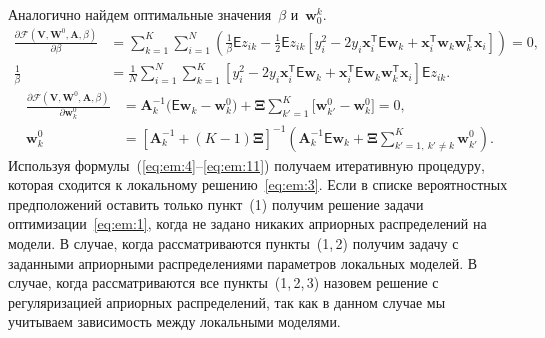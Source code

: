 \documentclass[12pt, twoside]{article}
\numberwithin{equation}{section}
\begin{document}
Аналогично найдем оптимальные значения~$\beta$ и~$\textbf{w}_0^{k}$.
\begin{equation}
\label{eq:em:10}
\begin{aligned}
\frac{\partial \mathcal{F}\left(\textbf{V}, \textbf{W}^{0}, \textbf{A}, \beta\right)}{\partial \beta} &= \sum_{k=1}^{K}\sum_{i=1}^{N}\left(\frac{1}{\beta}\mathsf{E}z_{ik}-\frac{1}{2}\mathsf{E}z_{ik}\left[y_{i}^{2}-2y_{i}\textbf{x}_{i}^{\mathsf{T}}\mathsf{E}\textbf{w}_{k}+\textbf{x}_{i}^{\mathsf{T}}\textbf{w}_{k}\textbf{w}_{k}^{\mathsf{T}}\textbf{x}_{i}\right]\right) = 0,\\
\frac{1}{\beta}&=\frac{1}{N}\sum_{i=1}^{N}\sum_{k=1}^{K}\left[y_{i}^{2}-2y_{i}\textbf{x}_{i}^{\mathsf{T}}\mathsf{E}\textbf{w}_{k} + \textbf{x}_{i}^{\mathsf{T}}\mathsf{E}\textbf{w}_{k}\textbf{w}_{k}^{\mathsf{T}}\textbf{x}_{i}\right]\mathsf{E}z_{ik}.
\end{aligned}
\end{equation}
\begin{equation}
\label{eq:em:11}
\begin{aligned}
\frac{\partial \mathcal{F}\left(\textbf{V}, \textbf{W}^{0}, \textbf{A}, \beta\right)}{\partial \mathbf{w}_k^0} &= \mathbf{A}_k^{-1}\bigr(\mathsf{E}\mathbf{w}_k - \mathbf{w}_{k}^{0}\bigr) + \bm{\Xi}\sum_{k'=1}^{K}\bigr[\mathbf{w}_{k'}^{0} -\mathbf{w}_{k}^{0}\bigr] = 0,\\
\textbf{w}_{k}^{0} &=\left[\textbf{A}_{k}^{-1}+\left(K-1\right)\bm{\Xi}\right]^{-1}\left(\textbf{A}^{-1}_{k}\mathsf{E}\textbf{w}_{k}+\bm{\Xi}\sum_{k'=1,~k'\not=k}^{K}\textbf{w}_{k'}^{0}\right).
\end{aligned}
\end{equation}
Используя формулы~(\ref{eq:em:4}--\ref{eq:em:11}) получаем итеративную процедуру, которая сходится к локальному решению~\eqref{eq:em:3}.
Если в списке вероятностных предположений оставить только пункт~(1) получим решение задачи оптимизации~\eqref{eq:em:1}, когда не задано никаких априорных распределений на модели. В случае, когда рассматриваются пункты~(1,\,2) получим задачу с заданными априорными распределениями параметров локальных моделей.  В случае, когда рассматриваются все пункты~(1,\,2,\,3) назовем решение с регуляризацией априорных распределений, так как в данном случае мы учитываем зависимость между локальными моделями.
\end{document}
